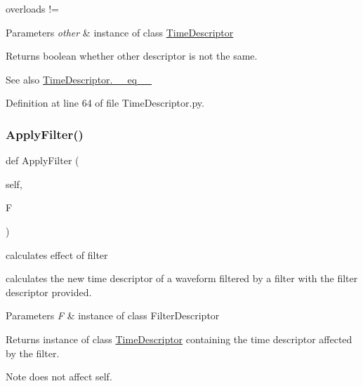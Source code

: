 overloads != 


\begin{DoxyParams}{Parameters}
{\em other} & instance of class \hyperlink{classSignalIntegrity_1_1TimeDomain_1_1Waveform_1_1TimeDescriptor_1_1TimeDescriptor}{Time\+Descriptor} \\
\hline
\end{DoxyParams}
\begin{DoxyReturn}{Returns}
boolean whether other descriptor is not the same. 
\end{DoxyReturn}
\begin{DoxySeeAlso}{See also}
\hyperlink{classSignalIntegrity_1_1TimeDomain_1_1Waveform_1_1TimeDescriptor_1_1TimeDescriptor_ad794ff077f2f05f228a7109f3670ac40}{Time\+Descriptor.\+\_\+\+\_\+eq\+\_\+\+\_\+} 
\end{DoxySeeAlso}


Definition at line 64 of file Time\+Descriptor.\+py.

\mbox{\label{classSignalIntegrity_1_1TimeDomain_1_1Waveform_1_1TimeDescriptor_1_1TimeDescriptor_ad33074bdcb7626cce17d93fbd43ca1a9}} 
\subsubsection{\texorpdfstring{Apply\+Filter()}{ApplyFilter()}}
{\footnotesize\ttfamily def Apply\+Filter (\begin{DoxyParamCaption}\item[{}]{self,  }\item[{}]{F }\end{DoxyParamCaption})}



calculates effect of filter 

calculates the new time descriptor of a waveform filtered by a filter with the filter descriptor provided.


\begin{DoxyParams}{Parameters}
{\em F} & instance of class Filter\+Descriptor \\
\hline
\end{DoxyParams}
\begin{DoxyReturn}{Returns}
instance of class \hyperlink{classSignalIntegrity_1_1TimeDomain_1_1Waveform_1_1TimeDescriptor_1_1TimeDescriptor}{Time\+Descriptor} containing the time descriptor affected by the filter. 
\end{DoxyReturn}
\begin{DoxyNote}{Note}
does not affect self. 
\end{DoxyNote}


